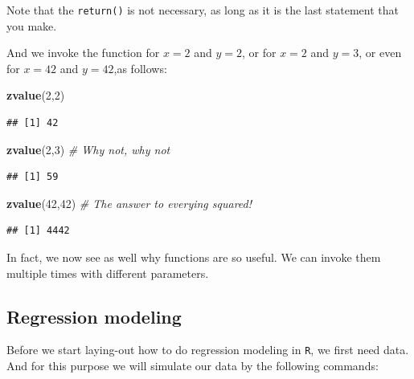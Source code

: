 \documentclass[]{article}
\newenvironment{Shaded}{\begin{snugshade}}{\end{snugshade}}
\newcommand{\KeywordTok}[1]{\textcolor[rgb]{0.13,0.29,0.53}{\textbf{{#1}}}}
\newcommand{\DecValTok}[1]{\textcolor[rgb]{0.00,0.00,0.81}{{#1}}}
\newcommand{\CommentTok}[1]{\textcolor[rgb]{0.56,0.35,0.01}{\textit{{#1}}}}
\newcommand{\NormalTok}[1]{{#1}}
\theoremstyle{definition}
\theoremstyle{definition}
\theoremstyle{definition}
\theoremstyle{remark}
\begin{document}
Note that the \texttt{return()} is not necessary, as long as it is the
last statement that you make.

And we invoke the function for \(x=2\) and \(y=2\), or for \(x=2\) and
\(y=3\), or even for \(x=42\) and \(y=42\),as follows:

\begin{Shaded}
\begin{Highlighting}[]
\KeywordTok{zvalue}\NormalTok{(}\DecValTok{2}\NormalTok{,}\DecValTok{2}\NormalTok{)}
\end{Highlighting}
\end{Shaded}

\begin{verbatim}
## [1] 42
\end{verbatim}

\begin{Shaded}
\begin{Highlighting}[]
\KeywordTok{zvalue}\NormalTok{(}\DecValTok{2}\NormalTok{,}\DecValTok{3}\NormalTok{) }\CommentTok{# Why not, why not}
\end{Highlighting}
\end{Shaded}

\begin{verbatim}
## [1] 59
\end{verbatim}

\begin{Shaded}
\begin{Highlighting}[]
\KeywordTok{zvalue}\NormalTok{(}\DecValTok{42}\NormalTok{,}\DecValTok{42}\NormalTok{) }\CommentTok{# The answer to everying squared!}
\end{Highlighting}
\end{Shaded}

\begin{verbatim}
## [1] 4442
\end{verbatim}

In fact, we now see as well why functions are so useful. We can invoke
them multiple times with different parameters.

\subsection{Regression modeling}\label{regression-modeling}

Before we start laying-out how to do regression modeling in \texttt{R},
we first need data. And for this purpose we will simulate our data by
the following commands:
\end{document}
